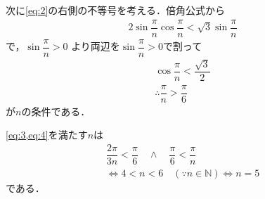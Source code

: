 \documentclass[../../main.tex]{subfiles}
\begin{document}
次に\cref{eq:2}の右側の不等号を考える．倍角公式から
\begin{align}
  2 \sin \dfrac{\pi}{n} \cos \dfrac{\pi}{n} < \sqrt{3} \sin \dfrac{\pi}{n}
\end{align}
で，$\sin \dfrac{\pi}{n} > 0$ より両辺を$\sin \dfrac{\pi}{n} > 0$で割って
\begin{align}
  \cos \dfrac{\pi}{n} < \dfrac{\sqrt{3}}{2} \\
  \therefore
  \dfrac{\pi}{n} > \dfrac{\pi}{6} \label{eq:4}
\end{align}
が$n$の条件である．

\cref{eq:3,eq:4}を満たす$n$は
\begin{align}
  \dfrac{2\pi}{3n} < \dfrac{\pi}{6} \quad \land \quad \dfrac{\pi}{6} < \dfrac{\pi}{n} \\
  \iff 4 < n < 6 \quad (\because n \in \mathbb{N})
  \iff n = 5
\end{align}
である．
\end{document}
